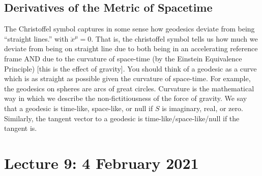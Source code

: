 \documentclass[11pt]{article}
\theoremstyle{definition}
\begin{document}
\subsection{Derivatives of the Metric of Spacetime}
The Christoffel symbol captures in some sense how geodesics deviate from being ``straight lines.'' with \( \ddot{x}^\mu = 0 \). That is, the christoffel symbol tells us how much we deviate from being on straight line due to both being in an accelerating reference frame AND due to the curvature of space-time (by the Einstein Equivalence Principle) [this is the effect of gravity]. You should think of a geodesic as a curve which is as straight as possible given the curvature of space-time. For example, the geodesics on spheres are arcs of great circles. Curvature is the mathematical way in which we describe the non-fictitiousness of the force of gravity.
\newline
\newline
We say that a geodesic is time-like, space-like, or null if \( S \) is imaginary, real, or zero. Similarly, the tangent vector to a geodesic is time-like/space-like/null if the tangent is. 

\section{Lecture 9: 4 February 2021}
\end{document}
